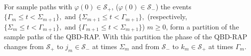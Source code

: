 For sample paths with \(\varphi(0)\in\mathcal S_+\), (\(\varphi(0)\in\mathcal S_-\)) the events \(\{\Gamma_m\leq t< \Sigma_{m+1}\} , \mbox{ and } \{\Sigma_{m+1}\leq t< \Gamma_{m+1}\}, \) (respectively, \(\{\Sigma_m\leq t< \Gamma_{m+1}\} , \mbox{ and } \{\Gamma_{m+1}\leq t< \Sigma_{m+1}\}\)) \(m\geq 0\), form a partition of the sample paths of the QBD-RAP. With this partition the phase of the QBD-RAP changes from \(\mathcal S_+\) to \(j_m\in\mathcal S_-\) at times \(\Sigma_{m}\) and from \(\mathcal S_-\) to \(k_m\in\mathcal S_+\) at times \(\Gamma_m\). %


